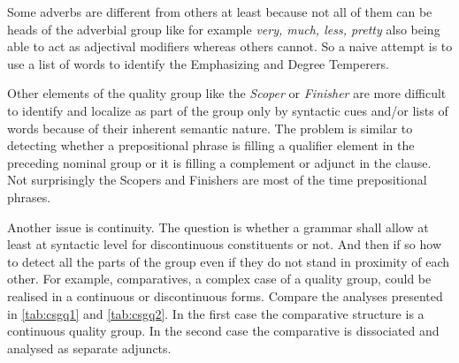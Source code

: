     Some adverbs are different from others at least because not all of them can be heads of the adverbial group like for example \textit{very, much, less, pretty} also being able to act as adjectival modifiers whereas others cannot. So a naive attempt is to use a list of words to identify the Emphasizing and Degree Temperers. 
    
    Other elements of the quality group like the \textit{Scoper} or \textit{Finisher} are more difficult to identify and localize as part of the group only by syntactic cues and/or lists of words because of their inherent semantic nature. The problem is similar to detecting whether a prepositional phrase is filling a qualifier element in the preceding nominal group or it is filling a complement or adjunct in the clause. Not surprisingly the Scopers and Finishers are most of the time prepositional phrases. 
	
	Another issue is continuity. The question is whether a grammar shall allow at least at syntactic level for discontinuous constituents or not. And then if so how to detect all the parts of the group even if they do not stand in proximity of each other. For example, comparatives, a complex case of a quality group, could be realised in a continuous or discontinuous forms. Compare the analyses presented in \ref{tab:csgq1} and \ref{tab:csgq2}. In the first case the comparative structure is a continuous quality group. In the second case the comparative is dissociated and analysed as separate adjuncts. 
	
